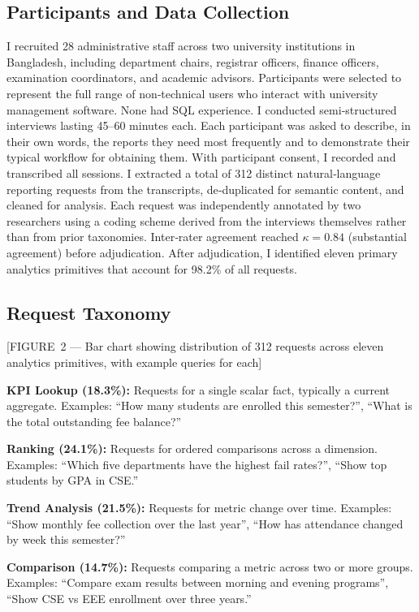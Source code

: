 \documentclass[11pt]{article}
\begin{document}
\subsection{Participants and Data Collection}
I recruited 28 administrative staff across two university institutions in Bangladesh, including department chairs, registrar officers, finance officers, examination coordinators, and academic advisors. Participants were selected to represent the full range of non‑technical users who interact with university management software. None had SQL experience. I conducted semi‑structured interviews lasting 45–60 minutes each. Each participant was asked to describe, in their own words, the reports they need most frequently and to demonstrate their typical workflow for obtaining them. With participant consent, I recorded and transcribed all sessions. I extracted a total of 312 distinct natural‑language reporting requests from the transcripts, de‑duplicated for semantic content, and cleaned for analysis. Each request was independently annotated by two researchers using a coding scheme derived from the interviews themselves rather than from prior taxonomies. Inter‑rater agreement reached $\kappa = 0.84$ (substantial agreement) before adjudication. After adjudication, I identified eleven primary analytics primitives that account for 98.2\% of all requests.

\subsection{Request Taxonomy}
[FIGURE 2 — Bar chart showing distribution of 312 requests across eleven analytics primitives, with example queries for each]

\noindent\textbf{KPI Lookup (18.3\%):} Requests for a single scalar fact, typically a current aggregate. Examples: ``How many students are enrolled this semester?'', ``What is the total outstanding fee balance?''

\noindent\textbf{Ranking (24.1\%):} Requests for ordered comparisons across a dimension. Examples: ``Which five departments have the highest fail rates?'', ``Show top students by GPA in CSE.''

\noindent\textbf{Trend Analysis (21.5\%):} Requests for metric change over time. Examples: ``Show monthly fee collection over the last year'', ``How has attendance changed by week this semester?''

\noindent\textbf{Comparison (14.7\%):} Requests comparing a metric across two or more groups. Examples: ``Compare exam results between morning and evening programs'', ``Show CSE vs EEE enrollment over three years.''
\end{document}
